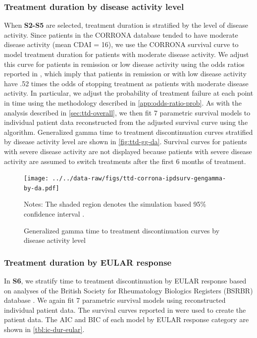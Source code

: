 \documentclass[11pt,final,fleqn]{article}
\theoremstyle{plain}
\begin{document}
\subsubsection{Treatment duration by disease activity level}\label{ttd-da}
When \textbf{S2-S5} are selected, treatment duration is stratified by the level of disease activity. Since patients in the CORRONA database tended to have moderate disease activity (mean CDAI = 16), we use the CORRONA survival curve to model treatment duration for patients with moderate disease activity. We adjust this curve for patients in remission or low disease activity using the odds ratios reported in \citet{zhang2011thresholds}, which imply that patients in remission or with low disease activity have .52 times the odds of stopping treatment as patients with moderate disease activity. In particular, we adjust the probability of treatment failure at each point in time using the methodology described in \autoref{app:odds-ratio-prob}. As with the analysis described in \autoref{sec:ttd-overall}, we then fit 7 parametric survival models to individual patient data reconstructed from the adjusted survival curve using the \citet{guyot2012enhanced} algorithm. Generalized gamma time to treatment discontinuation curves stratified by disease activity level are shown in \autoref{fig:ttd-gg-da}. Survival curves for patients with severe disease activity are not displayed because patients with severe disease activity are assumed to switch treatments after the first 6 months of treatment.

\begin{figure}[H]
\centering
\texttt{[image: ../../data-raw/figs/ttd-corrona-ipdsurv-gengamma-by-da.pdf]}
\caption{Generalized gamma time to treatment discontinuation curves by disease activity level}\label{fig:ttd-gg-da}
\begin{minipage}{\linewidth}
\footnotesize
Notes: The shaded region denotes the simulation based 95\% confidence interval \citep{mandel2013simulation}.
\end{minipage}
\end{figure}

\subsubsection{Treatment duration by EULAR response} \label{ttd-eular}
In \textbf{S6}, we stratify time to treatment discontinuation by EULAR response based on analyses of the British Society for Rheumatology Biologics Registers (BSRBR) database \citep{stevenson2016adalimumab}. We again fit 7 parametric survival models using reconstructed individual patient data. The survival curves reported in \citet{stevenson2016adalimumab} were used to create the patient data. The AIC and BIC of each model by EULAR response category are shown in \autoref{tbl:ic-dur-eular}.
\end{document}
